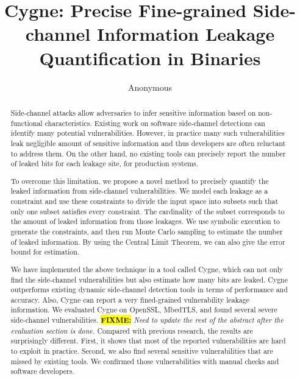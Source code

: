 \documentclass[conference]{IEEEtran}
\newcommand{\highlight}[1]{\colorbox{yellow}{\textbf{#1}}}
\newcommand{\fixme}[1]{\highlight{FIXME:} \emph{#1}}
\newcommand{\tool}{TANA}
\renewcommand{\tool}{CleverHans}
\renewcommand{\tool}{Cygne}
\begin{document}
\title{\tool{}: Precise Fine-grained Side-channel Information Leakage Quantification in Binaries}
\author{Anonymous}

\maketitle

\begin{abstract}
Side-channel attacks allow adversaries to infer sensitive information
based on non-functional characteristics.  Existing work on
software  side-channel detections can identify many potential
vulnerabilities.  %
However, in practice many such vulnerabilities leak negligible amount of sensitive information
and thus developers are often reluctant to address them. 
On the other hand,
no existing tools can precisely report the number of leaked
bits for each leakage site, for production systems.

To overcome this limitation, we propose a novel method to precisely
quantify the leaked information from side-channel vulnerabilities.  We
model each leakage as a constraint and use these constraints to
divide the input space into subsets such that  %
only one subset satisfies every constraint.  %
The cardinality of the subset corresponds to the amount of leaked
information from those leakages.
We use symbolic execution to
generate the constraints, 
and then run Monte Carlo sampling to estimate the number of
leaked information.  %
By using   %
the Central Limit Theorem, we can also give the error bound for
estimation.

We have implemented the above technique in a tool called \tool{},
which can not only find the side-channel vulnerabilities but also
estimate how many bits are leaked.  \tool{} outperforms existing
dynamic side-channel detection tools in terms of performance and
accuracy. Also, \tool{} can report a very fined-grained vulnerability
leakage information. 
 We evaluated 
\tool{} on OpenSSL, MbedTLS, and found several severe side-channel
vulnerabilities.
\fixme{Need to update the rest of the abstract after the evaluation section is done.}
Compared with previous research, the results are
surprisingly different.  First, it shows that most of the reported
vulnerabilities are hard to exploit in practice.  Second, we also find
several sensitive vulnerabilities that are missed by existing tools.
We confirmed those vulnerabilities with manual checks and software
developers.

\end{abstract}
\end{document}
